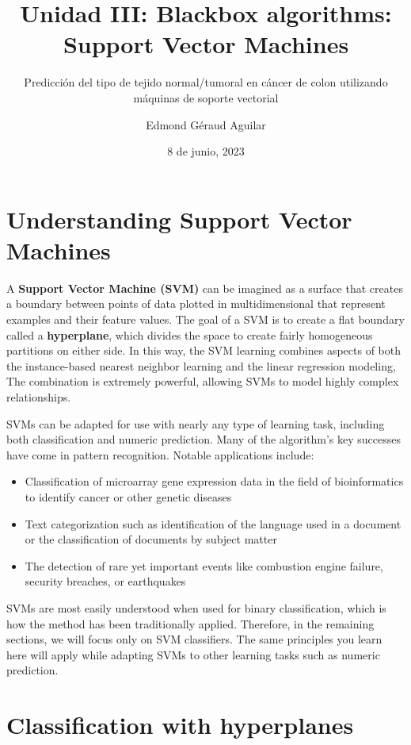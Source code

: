 \documentclass[
]{article}
\title{Unidad III: Blackbox algorithms: Support Vector Machines}
\subtitle{Predicción del tipo de tejido normal/tumoral en cáncer de
colon utilizando máquinas de soporte vectorial}
\author{Edmond Géraud Aguilar}
\date{8 de junio, 2023}
\providecommand{\tightlist}{%
  \setlength{\itemsep}{0pt}\setlength{\parskip}{0pt}}
\begin{document}
\maketitle

{
\hypersetup{linkcolor=}
\setcounter{tocdepth}{2}
\tableofcontents
}
\hypertarget{understanding-support-vector-machines}{%
\section{Understanding Support Vector
Machines}\label{understanding-support-vector-machines}}

A \textbf{Support Vector Machine (SVM)} can be imagined as a surface
that creates a boundary between points of data plotted in
multidimensional that represent examples and their feature values. The
goal of a SVM is to create a flat boundary called a \textbf{hyperplane},
which divides the space to create fairly homogeneous partitions on
either side. In this way, the SVM learning combines aspects of both the
instance-based nearest neighbor learning and the linear regression
modeling, The combination is extremely powerful, allowing SVMs to model
highly complex relationships.

SVMs can be adapted for use with nearly any type of learning task,
including both classification and numeric prediction. Many of the
algorithm's key successes have come in pattern recognition. Notable
applications include:

\begin{itemize}
\tightlist
\item
  Classification of microarray gene expression data in the field of
  bioinformatics to identify cancer or other genetic diseases
\item
  Text categorization such as identification of the language used in a
  document or the classification of documents by subject matter
\item
  The detection of rare yet important events like combustion engine
  failure, security breaches, or earthquakes
\end{itemize}

SVMs are most easily understood when used for binary classification,
which is how the method has been traditionally applied. Therefore, in
the remaining sections, we will focus only on SVM classifiers. The same
principles you learn here will apply while adapting SVMs to other
learning tasks such as numeric prediction.

\hypertarget{classification-with-hyperplanes}{%
\section{Classification with
hyperplanes}\label{classification-with-hyperplanes}}
\end{document}
